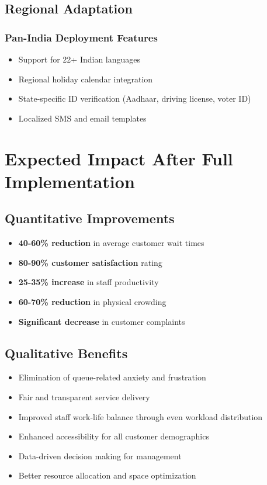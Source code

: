 \documentclass[12pt,a4paper]{report}
\begin{document}
\subsection{Regional Adaptation}

\subsubsection{Pan-India Deployment Features}
\begin{itemize}
    \item Support for 22+ Indian languages
    \item Regional holiday calendar integration
    \item State-specific ID verification (Aadhaar, driving license, voter ID)
    \item Localized SMS and email templates
\end{itemize}

\section{Expected Impact After Full Implementation}

\subsection{Quantitative Improvements}
\begin{itemize}
    \item \textbf{40-60\% reduction} in average customer wait times
    \item \textbf{80-90\% customer satisfaction} rating
    \item \textbf{25-35\% increase} in staff productivity
    \item \textbf{60-70\% reduction} in physical crowding
    \item \textbf{Significant decrease} in customer complaints
\end{itemize}

\subsection{Qualitative Benefits}
\begin{itemize}
    \item Elimination of queue-related anxiety and frustration
    \item Fair and transparent service delivery
    \item Improved staff work-life balance through even workload distribution
    \item Enhanced accessibility for all customer demographics
    \item Data-driven decision making for management
    \item Better resource allocation and space optimization
\end{itemize}
\end{document}
